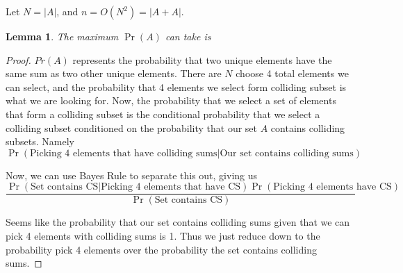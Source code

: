 \documentclass{article}
\newtheorem{lemma}{Lemma}
\begin{document}
Let $N=|A|$, and $n = O(N^2) = |A+A|$.
\begin{lemma}
The maximum $\Pr(A)$ can take is 
\end{lemma}
\begin{proof}
$Pr(A)$ represents the probability that two unique elements have the same sum as two other unique elements. There are $N$ choose 4 total elements we can select, and the probability that 4 elements we select form colliding subset is what we are looking for. Now, the probability that we select a set of elements that form a colliding subset is the conditional probability that we select a colliding subset conditioned on the probability that our set $A$ contains colliding subsets. Namely
$$\Pr(\textrm{Picking 4 elements that have colliding sums}|\textrm{Our set contains colliding sums})$$

Now, we can use Bayes Rule to separate this out, giving us
$$\frac{\Pr(\textrm{Set contains CS}|\textrm{Picking 4 elements that have CS})\Pr(\textrm{Picking 4 elements have CS})}{\Pr(\textrm{Set contains CS})}$$

Seems like the probability that our set contains colliding sums given that we can pick 4 elements with colliding sums is 1. Thus we just reduce down to the probability pick 4 elements over the probability the set contains colliding sums.
\end{proof}
\end{document}
